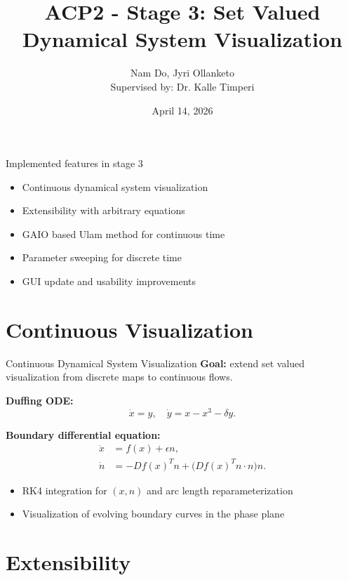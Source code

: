 \documentclass[aspectratio=169]{beamer}
\title{ACP2 - Stage 3: Set Valued Dynamical System Visualization}
\author{Nam Do, Jyri Ollanketo\\Supervised by: Dr. Kalle Timperi}
\institute{University of Oulu}
\date{April 14, 2026}
\begin{document}
\begin{frame}
  \titlepage
\end{frame}

\begin{frame}{Implemented features in stage 3}
  \begin{itemize}
    \item Continuous dynamical system visualization
    \item Extensibility with arbitrary equations
    \item GAIO based Ulam method for continuous time
    \item Parameter sweeping for discrete time
    \item GUI update and usability improvements
  \end{itemize}
\end{frame}

\section{Continuous Visualization}

\begin{frame}{Continuous Dynamical System Visualization}
  \textbf{Goal:} extend set valued visualization from discrete maps to continuous flows.

  \vspace{6pt}
  \textbf{Duffing ODE:}
  \begin{equation}
    \dot{x} = y, \quad \dot{y} = x - x^3 - \delta y.
  \end{equation}

  \vspace{4pt}
  \textbf{Boundary differential equation:}
  \begin{align}
    \dot{x} &= f(x) + \epsilon n, \\
    \dot{n} &= -Df(x)^T n + \bigl(Df(x)^T n \cdot n\bigr) n.
  \end{align}

  \vspace{4pt}
  \begin{itemize}
    \item RK4 integration for $(x,n)$ and arc length reparameterization
    \item Visualization of evolving boundary curves in the phase plane
  \end{itemize}
\end{frame}

\section{Extensibility}
\end{document}
